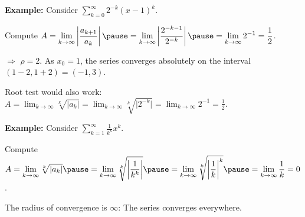 \documentclass[10pt,aspectratio=169]{beamer}
\begin{document}
\begin{frame}


\textbf{Example:}
Consider
\quad
$\displaystyle
\sum_{k=0}^\infty 2^{-k} {(x-1)}^k$.

\pause
Compute
\quad
$\displaystyle
A = \lim_{k\to\infty} 
\left \lvert
\frac{a_{k+1}}{a_k}
\right \rvert
\pause
=
\lim_{k\to\infty} 
\left \lvert
\frac{2^{-k-1}}{2^{-k}}
\right \rvert
\pause
=
\lim_{k\to\infty} 
2^{-1} = \frac{1}{2}$.

\pause
\medskip

$\Rightarrow$ $\rho = 2$.
\pause
As $x_0 = 1$,
the series converges absolutely on
the interval $(1-2,1+2) = (-1,3)$.

\medskip
\pause

Root test would also work:
\quad
$\displaystyle
A = 
\lim_{k\to\infty} 
\sqrt[k]{\lvert
a_k
\rvert}
=
\lim_{k\to\infty} 
\sqrt[k]{\lvert
2^{-k}
\rvert}
=
\lim_{k\to\infty} 
2^{-1}
=
\frac{1}{2}$.

\pause
\medskip

\textbf{Example:}
Consider
\quad
$\displaystyle
\sum_{k=1}^\infty \frac{1}{k^k} {x}^k$.

\pause
Compute
\quad
$\displaystyle
A =
\lim_{k\to\infty} 
\sqrt[k]{\lvert a_k \rvert}
\pause
=
\lim_{k\to\infty} 
\sqrt[k]{
\left\lvert\frac{1}{k^k}\right\rvert}
\pause
=
\lim_{k\to\infty} 
\sqrt[k]{
{\left\lvert\frac{1}{k}\right\rvert}^{k}}
\pause
=
\lim_{k\to\infty} 
\frac{1}{k}
=
0$.

\pause
\medskip

The radius of convergence is $\infty$: The series
converges everywhere.

\end{frame}
\end{document}
